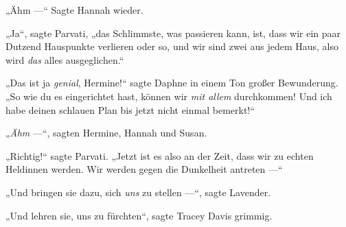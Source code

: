 „Ähm —“ Sagte Hannah wieder.

„Ja“, sagte Parvati, „das Schlimmste, was passieren kann, ist, dass wir ein paar Dutzend Hauspunkte verlieren oder so, und wir sind zwei aus jedem Haus, also wird \emph{das} alles ausgeglichen.“

„Das ist ja \emph{genial}, Hermine!“ sagte Daphne in einem Ton großer Bewunderung.
„So wie du es eingerichtet hast, können wir \emph{mit allem} durchkommen! Und ich habe deinen schlauen Plan bis jetzt nicht einmal bemerkt!“

„\emph{Ähm} —“, sagten Hermine, Hannah und Susan.

„Richtig!“ sagte Parvati.
„Jetzt ist es also an der Zeit, dass wir zu echten Heldinnen werden. Wir werden gegen die Dunkelheit antreten —“

„Und bringen sie dazu, sich \emph{uns} zu stellen —“, sagte Lavender.

„Und lehren sie, uns zu fürchten“, sagte Tracey Davis grimmig.

